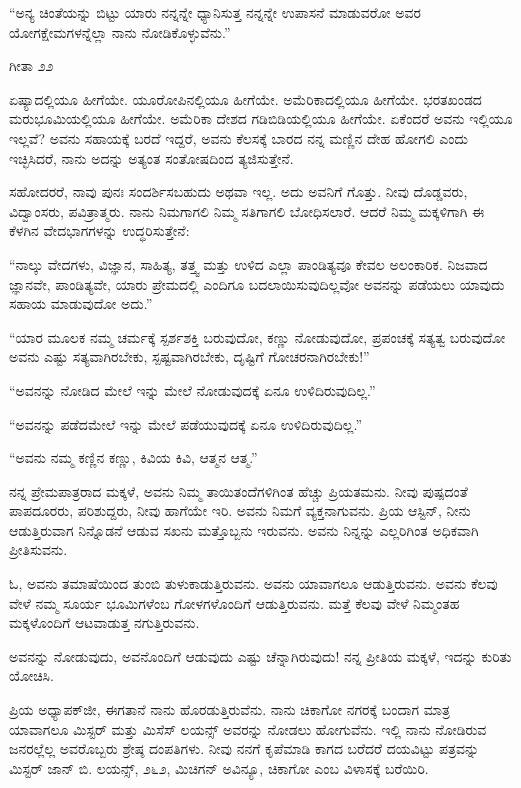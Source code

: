 “ಅನ್ಯ ಚಿಂತೆಯನ್ನು ಬಿಟ್ಟು ಯಾರು ನನ್ನನ್ನೇ ಧ್ಯಾನಿಸುತ್ತ ನನ್ನನ್ನೇ ಉಪಾಸನೆ ಮಾಡುವರೋ ಅವರ ಯೋಗಕ್ಷೇಮಗಳನ್ನೆಲ್ಲಾ ನಾನು ನೋಡಿಕೊಳ್ಳುವೆನು.”

\begin{flushright}
ಗೀತಾ  \enginline{-}೨೨
\end{flushright}

ಏಷ್ಯಾದಲ್ಲಿಯೂ ಹೀಗೆಯೇ. ಯೂರೋಪಿನಲ್ಲಿಯೂ ಹೀಗೆಯೇ. ಅಮೆರಿಕಾ\break ದಲ್ಲಿಯೂ ಹೀಗೆಯೇ. ಭರತಖಂಡದ ಮರುಭೂಮಿಯಲ್ಲಿಯೂ ಹೀಗೆಯೇ. ಅಮೆರಿಕಾ ದೇಶದ ಗಡಿಬಿಡಿಯಲ್ಲಿಯೂ ಹೀಗೆಯೇ. ಏಕೆಂದರೆ ಅವನು ಇಲ್ಲಿಯೂ ಇಲ್ಲವೆ? ಅವನು ಸಹಾಯಕ್ಕೆ ಬರದೆ ಇದ್ದರೆ, ಅವನು ಕೆಲಸಕ್ಕೆ ಬಾರದ ನನ್ನ ಮಣ್ಣಿನ ದೇಹ ಹೋಗಲಿ ಎಂದು ಇಚ್ಛಿಸಿದರೆ, ನಾನು ಅದನ್ನು ಅತ್ಯಂತ ಸಂತೋಷದಿಂದ ತ್ಯಜಿಸುತ್ತೇನೆ.

ಸಹೋದರರೆ, ನಾವು ಪುನಃ ಸಂದರ್ಶಿಸಬಹುದು ಅಥವಾ ಇಲ್ಲ. ಅದು ಅವನಿಗೆ ಗೊತ್ತು. ನೀವು ದೊಡ್ಡವರು, ವಿದ್ವಾಂಸರು, ಪವಿತ್ರಾತ್ಮರು. ನಾನು ನಿಮಗಾಗಲಿ ನಿಮ್ಮ ಸತಿಗಾಗಲಿ ಬೋಧಿಸಲಾರೆ. ಆದರೆ ನಿಮ್ಮ ಮಕ್ಕಳಿಗಾಗಿ ಈ ಕೆಳಗಿನ ವೇದಭಾಗಗಳನ್ನು ಉದ್ಧರಿಸುತ್ತೇನೆ:

“ನಾಲ್ಕು ವೇದಗಳು, ವಿಜ್ಞಾನ, ಸಾಹಿತ್ಯ, ತತ್ತ್ವ ಮತ್ತು ಉಳಿದ ಎಲ್ಲಾ ಪಾಂಡಿತ್ಯವೂ ಕೇವಲ ಅಲಂಕಾರಿಕ. ನಿಜವಾದ ಜ್ಞಾನವೇ, ಪಾಂಡಿತ್ಯವೇ, ಯಾರು ಪ್ರೇಮದಲ್ಲಿ ಎಂದಿಗೂ ಬದಲಾಯಿಸುವುದಿಲ್ಲವೋ ಅವನನ್ನು ಪಡೆಯಲು ಯಾವುದು ಸಹಾಯ ಮಾಡುವುದೋ ಅದು.”

“ಯಾರ ಮೂಲಕ ನಮ್ಮ ಚರ್ಮಕ್ಕೆ ಸ್ಪರ್ಶಶಕ್ತಿ ಬರುವುದೋ, ಕಣ್ಣು ನೋಡುವುದೋ, ಪ್ರಪಂಚಕ್ಕೆ ಸತ್ಯತ್ವ ಬರುವುದೋ ಅವನು ಎಷ್ಟು ಸತ್ಯವಾಗಿರಬೇಕು, ಸ್ಪಷ್ಟವಾಗಿರಬೇಕು, ದೃಷ್ಟಿಗೆ ಗೋಚರನಾಗಿರಬೇಕು!”

“ಅವನನ್ನು ನೋಡಿದ ಮೇಲೆ ಇನ್ನು ಮೇಲೆ ನೋಡುವುದಕ್ಕೆ ಏನೂ ಉಳಿದಿರುವುದಿಲ್ಲ.”

“ಅವನನ್ನು ಪಡೆದಮೇಲೆ ಇನ್ನು ಮೇಲೆ ಪಡೆಯುವುದಕ್ಕೆ ಏನೂ ಉಳಿದಿರುವುದಿಲ್ಲ.”

“ಅವನು ನಮ್ಮ ಕಣ್ಣಿನ ಕಣ್ಣು, ಕಿವಿಯ ಕಿವಿ, ಆತ್ಮನ ಆತ್ಮ.”

ನನ್ನ ಪ್ರೇಮಪಾತ್ರರಾದ ಮಕ್ಕಳೆ, ಅವನು ನಿಮ್ಮ ತಾಯಿತಂದೆಗಳಿಗಿಂತ ಹೆಚ್ಚು ಪ್ರಿಯತಮನು. ನೀವು ಪುಷ್ಪದಂತೆ ಪಾಪದೂರರು, ಪರಿಶುದ್ದರು, ನೀವು ಹಾಗೆಯೇ ಇರಿ. ಅವನು ನಿಮಗೆ ವ್ಯಕ್ತನಾಗುವನು. ಪ್ರಿಯ ಆಸ್ಟಿನ್, ನೀನು ಆಡುತ್ತಿರುವಾಗ ನಿನ್ನೊಡನೆ ಆಡುವ ಸಖನು ಮತ್ತೊಬ್ಬನು ಇರುವನು. ಅವನು ನಿನ್ನನ್ನು ಎಲ್ಲರಿಗಿಂತ ಅಧಿಕವಾಗಿ ಪ್ರೀತಿಸುವನು.

ಓ, ಅವನು ತಮಾಷೆಯಿಂದ ತುಂಬಿ ತುಳುಕಾಡುತ್ತಿರುವನು. ಅವನು ಯಾವಾಗಲೂ ಆಡುತ್ತಿರುವನು. ಅವನು ಕೆಲವು ವೇಳೆ ನಮ್ಮ ಸೂರ್ಯ ಭೂಮಿಗಳೆಂಬ ಗೋಳಗಳೊಂದಿಗೆ ಆಡುತ್ತಿರುವನು. ಮತ್ತೆ ಕೆಲವು ವೇಳೆ ನಿಮ್ಮಂತಹ ಮಕ್ಕಳೊಂದಿಗೆ ಆಟವಾಡುತ್ತ ನಗುತ್ತಿರುವನು.

ಅವನನ್ನು ನೋಡುವುದು, ಅವನೊಂದಿಗೆ ಆಡುವುದು ಎಷ್ಟು ಚೆನ್ನಾಗಿರುವುದು! ನನ್ನ ಪ್ರೀತಿಯ ಮಕ್ಕಳೆ, ಇದನ್ನು ಕುರಿತು ಯೋಚಿಸಿ.

ಪ್ರಿಯ ಅಧ್ಯಾಪಕ್‌ಜೀ, ಈಗತಾನೆ ನಾನು ಹೊರಡುತ್ತಿರುವೆನು. ನಾನು ಚಿಕಾಗೋ ನಗರಕ್ಕೆ ಬಂದಾಗ ಮಾತ್ರ ಯಾವಾಗಲೂ ಮಿಸ್ಟರ್ ಮತ್ತು ಮಿಸೆಸ್ ಲಯನ್ಸ್ ಅವರನ್ನು ನೋಡಲು ಹೋಗುವೆನು. ಇಲ್ಲಿ ನಾನು ನೋಡಿರುವ ಜನರಲ್ಲೆಲ್ಲ ಅವರೊಬ್ಬರು ಶ್ರೇಷ್ಠ ದಂಪತಿಗಳು. ನೀವು ನನಗೆ ಕೃಪೆಮಾಡಿ ಕಾಗದ ಬರೆದರೆ ದಯವಿಟ್ಟು ಪತ್ರವನ್ನು ಮಿಸ್ಟರ್ ಜಾನ್ ಬಿ. ಲಯನ್ಸ್, ೨೬೨, ಮಿಚಿಗನ್ ಅವಿನ್ಯೂ, ಚಿಕಾಗೋ ಎಂಬ ವಿಳಾಸಕ್ಕೆ ಬರೆಯಿರಿ.

